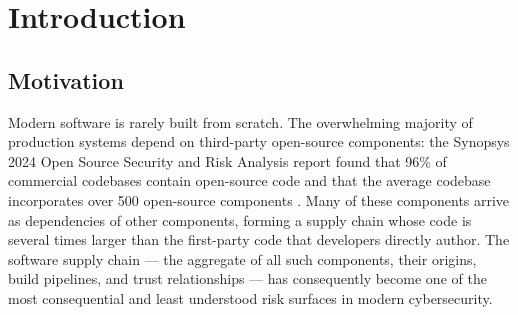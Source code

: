 \chapter[Introduction]{Introduction}
\label{cp:introduction}

\section{Motivation}
\label{sec:motivation}

Modern software is rarely built from scratch. The overwhelming majority of production systems depend on third-party open-source components: the Synopsys 2024 Open Source Security and Risk Analysis report found that 96\% of commercial codebases contain open-source code and that the average codebase incorporates over 500 open-source components \citep{Synopsys2024OSSRA}. Many of these components arrive as dependencies of other components, forming a supply chain whose code is several times larger than the first-party code that developers directly author. The software supply chain --- the aggregate of all such components, their origins, build pipelines, and trust relationships --- has consequently become one of the most consequential and least understood risk surfaces in modern cybersecurity.

